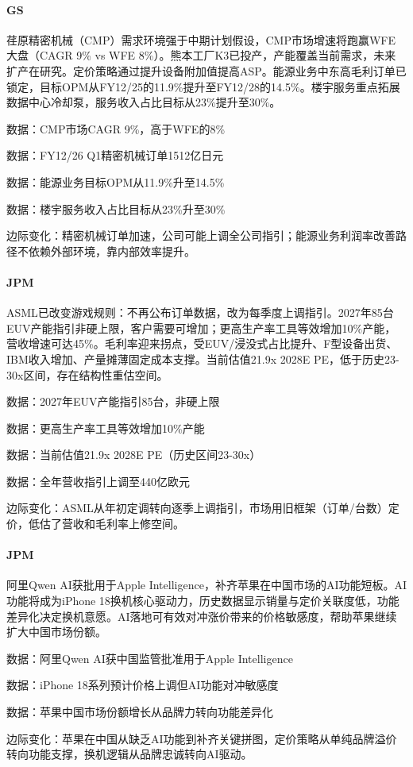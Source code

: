 \documentclass[11pt]{ctexart}
\begin{document}
\paragraph{GS} 荏原精密机械（CMP）需求环境强于中期计划假设，CMP市场增速将跑赢WFE大盘（CAGR 9\% vs WFE 8\%）。熊本工厂K3已投产，产能覆盖当前需求，未来扩产在研究。定价策略通过提升设备附加值提高ASP。能源业务中东高毛利订单已锁定，目标OPM从FY12/25的11.9\%提升至FY12/28的14.5\%。楼宇服务重点拓展数据中心冷却泵，服务收入占比目标从23\%提升至30\%。
{\small\color{refgray}数据：CMP市场CAGR 9\%，高于WFE的8\%\par}
{\small\color{refgray}数据：FY12/26 Q1精密机械订单1512亿日元\par}
{\small\color{refgray}数据：能源业务目标OPM从11.9\%升至14.5\%\par}
{\small\color{refgray}数据：楼宇服务收入占比目标从23\%升至30\%\par}
{\small\color{refgray}边际变化：精密机械订单加速，公司可能上调全公司指引；能源业务利润率改善路径不依赖外部环境，靠内部效率提升。\par}
\paragraph{JPM} ASML已改变游戏规则：不再公布订单数据，改为每季度上调指引。2027年85台EUV产能指引非硬上限，客户需要可增加；更高生产率工具等效增加10\%产能，营收增速可达45\%。毛利率迎来拐点，受EUV/浸没式占比提升、F型设备出货、IBM收入增加、产量摊薄固定成本支撑。当前估值21.9x 2028E PE，低于历史23-30x区间，存在结构性重估空间。
{\small\color{refgray}数据：2027年EUV产能指引85台，非硬上限\par}
{\small\color{refgray}数据：更高生产率工具等效增加10\%产能\par}
{\small\color{refgray}数据：当前估值21.9x 2028E PE（历史区间23-30x）\par}
{\small\color{refgray}数据：全年营收指引上调至440亿欧元\par}
{\small\color{refgray}边际变化：ASML从年初定调转向逐季上调指引，市场用旧框架（订单/台数）定价，低估了营收和毛利率上修空间。\par}
\paragraph{JPM} 阿里Qwen AI获批用于Apple Intelligence，补齐苹果在中国市场的AI功能短板。AI功能将成为iPhone 18换机核心驱动力，历史数据显示销量与定价关联度低，功能差异化决定换机意愿。AI落地可有效对冲涨价带来的价格敏感度，帮助苹果继续扩大中国市场份额。
{\small\color{refgray}数据：阿里Qwen AI获中国监管批准用于Apple Intelligence\par}
{\small\color{refgray}数据：iPhone 18系列预计价格上调但AI功能对冲敏感度\par}
{\small\color{refgray}数据：苹果中国市场份额增长从品牌力转向功能差异化\par}
{\small\color{refgray}边际变化：苹果在中国从缺乏AI功能到补齐关键拼图，定价策略从单纯品牌溢价转向功能支撑，换机逻辑从品牌忠诚转向AI驱动。\par}
\end{document}
